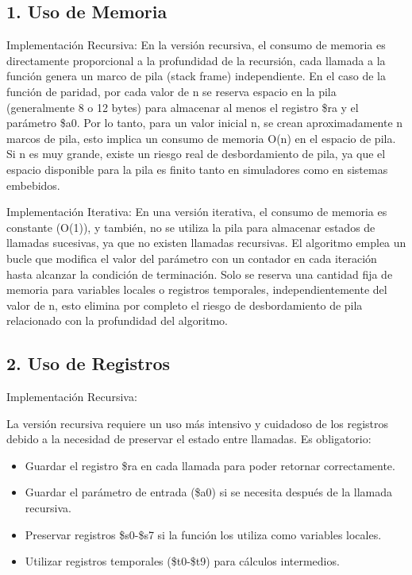 \documentclass[12pt, letterpaper]{article}
\begin{document}
\subsection*{1. Uso de Memoria}

Implementación Recursiva:
En la versión recursiva, el consumo de memoria es directamente proporcional a la profundidad de la recursión, cada llamada a la función genera un marco de pila (stack frame) independiente. En el caso de la función de paridad, por cada valor de n se reserva espacio en la pila (generalmente 8 o 12 bytes) para almacenar al menos el registro \$ra y el parámetro \$a0. Por lo tanto, para un valor inicial n, se crean aproximadamente n marcos de pila, esto implica un consumo de memoria O(n) en el espacio de pila. Si n es muy grande, existe un riesgo real de desbordamiento de pila, ya que el espacio disponible para la pila es finito tanto en simuladores como en sistemas embebidos.

Implementación Iterativa:
En una versión iterativa, el consumo de memoria es constante (O(1)), y también, no se utiliza la pila para almacenar estados de llamadas sucesivas, ya que no existen llamadas recursivas. El algoritmo emplea un bucle que modifica el valor del parámetro con un contador en cada iteración hasta alcanzar la condición de terminación. Solo se reserva una cantidad fija de memoria para variables locales o registros temporales, independientemente del valor de n, esto elimina por completo el riesgo de desbordamiento de pila relacionado con la profundidad del algoritmo.

\subsection*{2. Uso de Registros}

Implementación Recursiva:

La versión recursiva requiere un uso más intensivo y cuidadoso de los registros debido a la necesidad de preservar el estado entre llamadas. Es obligatorio:

\begin{itemize}
    \item Guardar el registro \$ra en cada llamada para poder retornar correctamente.
    \item Guardar el parámetro de entrada (\$a0) si se necesita después de la llamada recursiva.
    \item Preservar registros \$s0-\$s7 si la función los utiliza como variables locales.
    \item Utilizar registros temporales (\$t0-\$t9) para cálculos intermedios.
\end{itemize}
\end{document}
